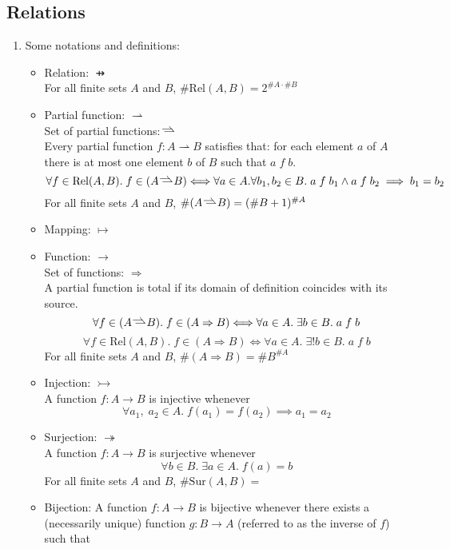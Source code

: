 \documentclass{article}
\newcommand{\partf}{\rightharpoonup\!\!\!\!\!\!\!\!\!\raisebox{2.5pt}{$\rightharpoonup$}}
\begin{document}
\subsection{Relations}
\begin{enumerate}
    \item Some notations and definitions:
        \begin{itemize}[label={-},topsep=0pt]
            \item Relation: $\pfun$\\
                For all finite sets $A$ and $B$, $\#\text{Rel}(A, B)=2^{\#A\cdot\#B}$
            \item Partial function: $\rightharpoonup$\\
                Set of partial functions: $\partf$\\
                Every partial function $f:A\rightharpoonup B$ satisfies that: for each element $a$ of $A$ there is at most one element $b$ of $B$ such that $a\;f\;b$.
                $$\forall f\in\text{Rel}(A, B).\;f\in(A\partf\;B)\Longleftrightarrow\forall a\in A.\forall b_1,b_2\in B.\;a\;f\;b_1\wedge a\;f\;b_2\implies b_1=b_2$$
                For all finite sets $A$ and $B$, $\#(A\partf\;B) = (\#B+1)^{\#A}$
            \item Mapping: $\mapsto$
            \item Function: $\rightarrow$\\
                Set of functions: $\Rightarrow$\\
                A partial function is total if its domain of definition coincides with its source.
                $$\forall f\in(A\partf\;B).\;f\in(A\Rightarrow B)\Longleftrightarrow\forall a\in A.\;\exists b\in B.\;a\;f\;b$$
                $$\forall f\in\text{Rel}(A, B).\;f\in(A\Rightarrow B)\Longleftrightarrow\forall a\in A.\;\exists!b\in B.\;a\;f\;b$$
                For all finite sets $A$ and $B$, $\#(A\Rightarrow B) = \#B^{\#A}$
            \item Injection: $\rightarrowtail$\\
                A function $f:A\rightarrow B$ is injective whenever 
                $$\forall a_1,\;a_2\in A.\;f(a_1)=f(a_2)\implies a_1=a_2$$
            \item Surjection: $\twoheadrightarrow$\\
                A function $f:A\rightarrow B$ is surjective whenever 
                $$\forall b\in B.\;\exists a\in A.\;f(a)=b$$
                For all finite sets $A$ and $B$, $\#\text{Sur}(A,B)=$
            \item Bijection: A function $f:A\rightarrow B$ is bijective whenever there exists a (necessarily unique) function $g:B\rightarrow A$ (referred to as the inverse of $f$) such that

\end{itemize}
\end{enumerate}
\end{document}
